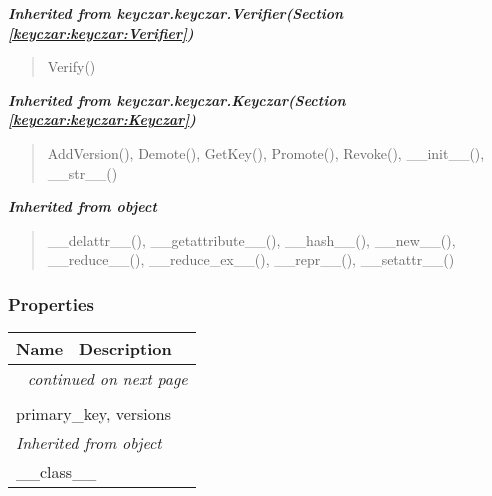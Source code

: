 \large{\textbf{\textit{Inherited from keyczar.keyczar.Verifier\textit{(Section \ref{keyczar:keyczar:Verifier})}}}}

\begin{quote}
Verify()
\end{quote}

\large{\textbf{\textit{Inherited from keyczar.keyczar.Keyczar\textit{(Section \ref{keyczar:keyczar:Keyczar})}}}}

\begin{quote}
AddVersion(), Demote(), GetKey(), Promote(), Revoke(), \_\_init\_\_(), \_\_str\_\_()
\end{quote}

\large{\textbf{\textit{Inherited from object}}}

\begin{quote}
\_\_delattr\_\_(), \_\_getattribute\_\_(), \_\_hash\_\_(), \_\_new\_\_(), \_\_reduce\_\_(), \_\_reduce\_ex\_\_(), \_\_repr\_\_(), \_\_setattr\_\_()
\end{quote}


  \subsubsection{Properties}

    \vspace{-1cm}
\hspace{\varindent}\begin{longtable}{|p{\varnamewidth}|p{\vardescrwidth}|l}
\cline{1-2}
\cline{1-2} \centering \textbf{Name} & \centering \textbf{Description}& \\
\cline{1-2}
\endhead\cline{1-2}\multicolumn{3}{r}{\small\textit{continued on next page}}\\\endfoot\cline{1-2}
\endlastfoot\multicolumn{2}{|l|}{\textit{Inherited from keyczar.keyczar.Keyczar \textit{(Section \ref{keyczar:keyczar:Keyczar})}}}\\
\multicolumn{2}{|p{\varwidth}|}{\raggedright primary\_key, versions}\\
\cline{1-2}
\multicolumn{2}{|l|}{\textit{Inherited from object}}\\
\multicolumn{2}{|p{\varwidth}|}{\raggedright \_\_class\_\_}\\
\cline{1-2}
\end{longtable}

